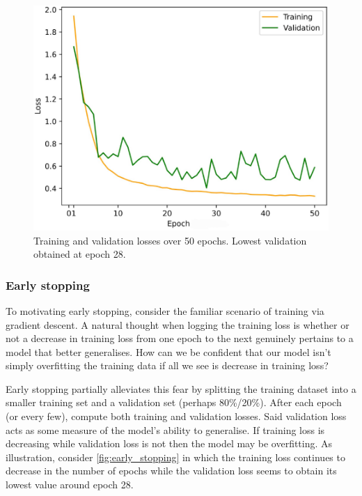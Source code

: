 \documentclass[11pt]{article}
\begin{document}
\begin{figure}[t]
    \centering
    \begin{minipage}{0.55\linewidth}
        \includegraphics[width=\linewidth]{./figures/neural_nets/REG_early_stopping.pdf}
    \end{minipage}%
    \hfill
    \begin{minipage}{0.44\linewidth}
        \caption{Training and validation losses over 50 epochs. Lowest validation obtained at epoch 28.}
        \label{fig:early_stopping}
    \end{minipage}
\end{figure}

\subsubsection{Early stopping} To motivating early stopping, consider the familiar scenario of training via gradient descent. A natural thought when logging the training loss is whether or not a decrease in training loss from one epoch to the next genuinely pertains to a model that better generalises. How can we be confident that our model isn't simply overfitting the training data if all we see is decrease in training loss?

Early stopping partially alleviates this fear by splitting the training dataset into a smaller training set and a validation set (perhaps 80\%/20\%). After each epoch (or every few), compute both training and validation losses. Said validation loss acts as some measure of the model's ability to generalise. If training loss is decreasing while validation loss is not then the model may be overfitting. As illustration, consider \autoref{fig:early_stopping} in which the training loss continues to decrease in the number of epochs while the validation loss seems to obtain its lowest value around epoch 28.
\end{document}
